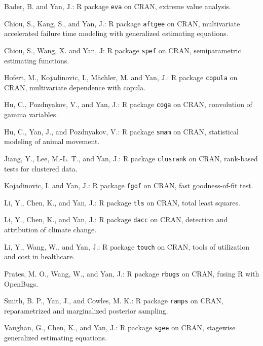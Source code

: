\documentclass[Statistics]{vita}
\begin{document}
\begin{vita}
\begin{Publications}
\begin{UnderReview}
  \end{UnderReview}
  \begin{Software}
  \item *Bader, B. and Yan, J.: R package \texttt{eva} on CRAN, extreme value analysis.
  \item *Chiou, S., Kang, S., and Yan, J.: R package \texttt{aftgee} on CRAN, multivariate accelerated failure time modeling with generalized estimating equations.
  \item *Chiou, S., Wang, X. and Yan, J: R package \texttt{spef} on CRAN, semiparametric estimating functions.
  \item Hofert, M., Kojadinovic, I.,  M\"achler, M. and Yan, J.: R package \texttt{copula} on CRAN, multivariate dependence with copula.
  \item *Hu, C., Pozdnyakov, V., and Yan, J.: R package \texttt{coga} on CRAN, convolution of gamma variables.
  \item *Hu, C., Yan, J., and Pozdnyakov, V.: R package \texttt{smam} on CRAN, statistical modeling of animal movement. 
  \item *Jiang, Y., Lee, M.-L. T., and Yan, J.: R package \texttt{clusrank} on CRAN, rank-based tests for clustered data.
  \item Kojadinovic, I. and Yan, J.: R package \texttt{fgof} on CRAN, fast goodness-of-fit test.
  \item *Li, Y., Chen, K., and Yan, J.: R package \texttt{tls} on CRAN, total least squares.
  \item *Li, Y., Chen, K., and Yan, J.: R package \texttt{dacc} on CRAN, detection and attribution of climate change.
  \item *Li, Y., Wang, W., and Yan, J.: R package \texttt{touch} on CRAN, tools of utilization and cost in healthcare.
  \item *Prates, M. O., Wang, W., and Yan, J.: R package \texttt{rbugs} on CRAN, fusing R with OpenBugs.
  \item Smith, B. P., Yan, J., and Cowles, M. K.: R package \texttt{ramps} on CRAN, reparametrized and marginalized posterior sampling.
  \item *Vaughan, G., Chen, K., and Yan, J.: R package \texttt{sgee} on CRAN, stagewise generalized estimating equations.

\end{Software}
\end{Publications}
\end{vita}
\end{document}
